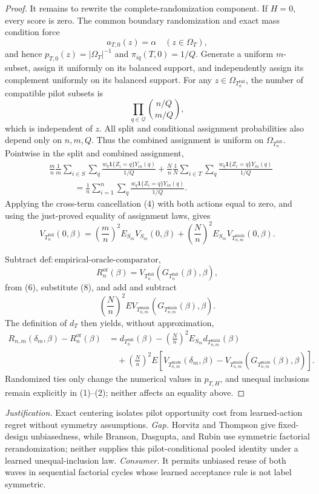 \documentclass{article}
\begin{document}
\begin{proof}
It remains to rewrite the complete-randomization component.  If \(H=0\), every score is zero.  The common boundary randomization and exact mass condition force
\[
a_{T,0}(z)=\alpha\quad(z\in\Omega_T),
\]
and hence \(p_{T,0}(z)=|\Omega_T|^{-1}\) and \(\pi_{iq}(T,0)=1/Q\).  Generate a uniform \(m\)-subset, assign it uniformly on its balanced support, and independently assign its complement uniformly on its balanced support.  For any \(z\in\Omega_{T_n^{\mathrm{full}}}\), the number of compatible pilot subsets is
\[
\prod_{q\in\mathcal Q}{n/Q\choose m/Q},
\]
which is independent of \(z\).  All split and conditional assignment probabilities also depend only on \(n,m,Q\).  Thus the combined assignment is uniform on \(\Omega_{T_n^{\mathrm{full}}}\).  Pointwise in the split and combined assignment,
\[
\begin{aligned}
&\frac mn\frac1m\sum_{i\in S}\sum_q
\frac{w_q\mathbf 1\{Z_i=q\}Y_{in}(q)}{1/Q}
+\frac Nn\frac1N\sum_{i\in T}\sum_q
\frac{w_q\mathbf 1\{Z_i=q\}Y_{in}(q)}{1/Q}\\
&\hspace{3em}
=\frac1n\sum_{i=1}^n\sum_q
\frac{w_q\mathbf 1\{Z_i=q\}Y_{in}(q)}{1/Q}.
\end{aligned}
\tag{7}
\]
Applying the cross-term cancellation (4) with both actions equal to zero, and using the just-proved equality of assignment laws, gives
\[
V_{T_n^{\mathrm{full}}}(0,\beta)
=\left(\frac mn\right)^2E_{S_m}V_{S_m}(0,\beta)
+\left(\frac Nn\right)^2E_{S_m}
V_{T_{n,m}^{\mathrm{main}}}(0,\beta).
\tag{8}
\]

Subtract \(\mathrm{def{:}empirical\text{-}oracle\text{-}comparator}\),
\[
R_n^{\mathrm{or}}(\beta)
=V_{T_n^{\mathrm{full}}}
\!\left(G_{T_n^{\mathrm{full}}}(\beta),\beta\right),
\]
from (6), substitute (8), and add and subtract
\[
\left(\frac Nn\right)^2E
V_{T_{n,m}^{\mathrm{main}}}
\!\left(G_{T_{n,m}^{\mathrm{main}}}(\beta),\beta\right).
\]
The definition of \(d_T\) then yields, without approximation,
\[
\begin{aligned}
R_{n,m}(\delta_m,\beta)-R_n^{\mathrm{or}}(\beta)
&=d_{T_n^{\mathrm{full}}}(\beta)
-\left(\frac Nn\right)^2E_{S_m}
d_{T_{n,m}^{\mathrm{main}}}(\beta)\\
&\quad+\left(\frac Nn\right)^2E\!\left[
V_{T_{n,m}^{\mathrm{main}}}(\delta_m,\beta)
-V_{T_{n,m}^{\mathrm{main}}}
\!\left(G_{T_{n,m}^{\mathrm{main}}}(\beta),\beta\right)
\right].
\end{aligned}
\]
Randomized ties only change the numerical values in \(p_{T,H}\), and unequal inclusions remain explicitly in (1)--(2); neither affects an equality above.
\end{proof}
\par\smallskip\noindent \textit{Justification.} Exact centering isolates pilot opportunity cost from learned-action regret without symmetry assumptions. \textit{Gap.} Horvitz and Thompson give fixed-design unbiasedness, while Branson, Dasgupta, and Rubin use symmetric factorial rerandomization; neither supplies this pilot-conditional pooled identity under a learned unequal-inclusion law. \textit{Consumer.} It permits unbiased reuse of both waves in sequential factorial cycles whose learned acceptance rule is not label symmetric.
\end{document}
